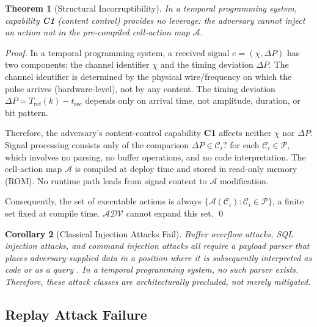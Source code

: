 \documentclass[twocolumn,10pt]{article}
\newtheorem{theorem}{Theorem}[section]
\newtheorem{corollary}[theorem]{Corollary}
\newcommand{\DP}{\Delta P}          %
\newcommand{\Tref}{T_{\mathrm{ref}}}
\newcommand{\trec}{t_{\mathrm{rec}}}
\newcommand{\calC}{\mathcal{C}}     %
\newcommand{\calP}{\mathcal{P}}     %
\begin{document}
\begin{theorem}[Structural Incorruptibility]
\label{thm:nopayload}
In a temporal programming system, capability \textbf{C1} (content
control) provides no leverage: the adversary cannot inject an action
not in the pre-compiled cell-action map $\mathcal{A}$.
\end{theorem}
\begin{proof}
In a temporal programming system, a received signal $e = (\chi, \DP)$
has two components: the channel identifier $\chi$ and the timing
deviation $\DP$. The channel identifier is determined by the physical
wire/frequency on which the pulse arrives (hardware-level), not by any
content. The timing deviation $\DP = \Tref(k) - \trec$ depends only
on arrival time, not amplitude, duration, or bit pattern.

Therefore, the adversary's content-control capability \textbf{C1}
affects neither $\chi$ nor $\DP$. Signal processing consists only of
the comparison $\DP \in \calC_i?$ for each $\calC_i \in \calP$, which
involves no parsing, no buffer operations, and no code interpretation.
The cell-action map $\mathcal{A}$ is compiled at deploy time and
stored in read-only memory (ROM). No runtime path leads from signal
content to $\mathcal{A}$ modification.

Consequently, the set of executable actions is always
$\{\mathcal{A}(\calC_i) : \calC_i \in \calP\}$, a finite set fixed
at compile time. $\mathcal{ADV}$ cannot expand this set.
\qed
\end{proof}

\begin{corollary}[Classical Injection Attacks Fail]
\label{cor:noinjection}
Buffer overflow attacks, SQL injection attacks, and command injection
attacks all require a payload parser that places adversary-supplied
data in a position where it is subsequently interpreted as code or
as a query \cite{saltzer1975protection}. In a temporal programming
system, no such parser exists. Therefore, these attack classes are
architecturally precluded, not merely mitigated.
\end{corollary}

\subsection{Replay Attack Failure}
\end{document}
